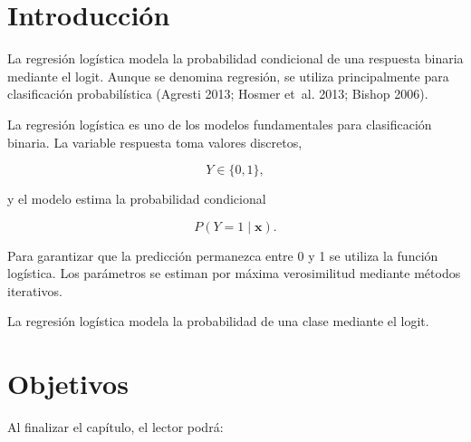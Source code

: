 \documentclass[
  spanish,
  10.5pt,
  letterpaper,
  DIV=11,
  numbers=noendperiod,
  oneside,
  open=any]{scrreprt}
\theoremstyle{definition}
\theoremstyle{definition}
\theoremstyle{plain}
\theoremstyle{remark}
\begin{document}
\section*{Introducción}\label{introducciuxf3n-11}


La regresión logística modela la probabilidad condicional de una
respuesta binaria mediante el logit. Aunque se denomina regresión, se
utiliza principalmente para clasificación probabilística (Agresti 2013;
Hosmer et~al. 2013; Bishop 2006).

La regresión logística es uno de los modelos fundamentales para
clasificación binaria. La variable respuesta toma valores discretos,

\[
Y\in\{0,1\},
\]

y el modelo estima la probabilidad condicional

\[
P(Y=1\mid\mathbf{x}).
\]

Para garantizar que la predicción permanezca entre 0 y 1 se utiliza la
función logística. Los parámetros se estiman por máxima verosimilitud
mediante métodos iterativos.

\begin{tcolorbox}[enhanced jigsaw, arc=.35mm, bottomrule=.15mm, bottomtitle=1mm, breakable, colback=white, colbacktitle=quarto-callout-important-color!10!white, colframe=quarto-callout-important-color-frame, coltitle=black, left=2mm, leftrule=.75mm, opacityback=0, opacitybacktitle=0.6, rightrule=.15mm, title=\textcolor{quarto-callout-important-color}{\faExclamation}\hspace{0.5em}{Definición esencial}, titlerule=0mm, toprule=.15mm, toptitle=1mm]

La regresión logística modela la probabilidad de una clase mediante el
logit.

\end{tcolorbox}

\section*{Objetivos}\label{objetivos-10}


Al finalizar el capítulo, el lector podrá:
\end{document}
